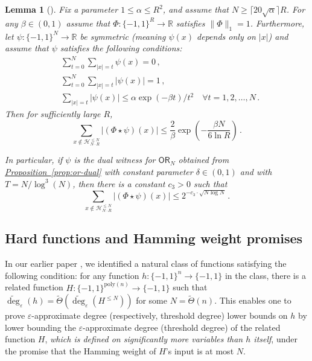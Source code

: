 \documentclass[11pt]{article}
\numberwithin{equation}{section}
\newtheorem{lemma}[theorem]{Lemma}
\theoremstyle{definition}
\theoremstyle{plain}
\newcommand{\R}{\mathbb R}
\newcommand{\expref}[2]{\hyperref[#2]{#1~\ref{#2}}}
\newcommand{\poly}{\mathrm{poly}}
\newcommand{\OR}{\mathsf{ OR}}
\newcommand{\bits}{\{-1,1\}}
\newcommand{\ls}{\star}
\newcommand{\eps}{\varepsilon}
\newcommand{\adeg}{\widetilde{\operatorname{deg}}}
\begin{document}
\begin{lemma}[\cite{bkt}] \label{prop:prelim-mass}
	Fix a parameter $1 \leq \alpha \leq R^2$, and assume that $N \geq \lceil 20 \sqrt{\alpha} \rceil R$.
	For any $\beta \in (0,1)$
	assume that $\Phi : \bits^R \to \R$ satisfies $\|\Phi\|_1=1$. Furthermore, let $\psi : \bits^N \to \R$ be symmetric
	(meaning $\psi(x)$ depends only on $|x|$) and assume that $\psi$ satisfies the following conditions: 
	\begin{align}
&\sum_{t = 0}^N \sum_{|x|=t} \psi(x) = 0\,, \label{eqn:omega-balanced}\\
&\sum_{t = 0}^N \sum_{|x| = t} |\psi(x)| = 1\,, \label{eqn:omega-norm}\\
&\sum_{|x| = t} |\psi(x)| \le \alpha \exp (-\beta t) / t^2 \quad \forall t = 1, 2, \dots, N\,. \label{eqn:omega-decay}
	\end{align}
	Then for sufficiently large $R$, 
	\begin{equation}
	\sum_{x \notin \mathcal{H}^{\le N}_{N \cdot R}} |(\Phi \ls \psi)(x)| \le \frac{2}{\beta} \exp\left(-\frac{\beta N}{6 \ln R}\right)\,.
	\label{eqn:prelim-mass}
	\end{equation}
	
	In particular, if $\psi$ is the dual witness for $\OR_N$ obtained from \expref{Proposition}{prop:or-dual} with constant parameter $\delta \in (0, 1)$ and with $T=N/\log^3(N)$,
	then there is a constant $c_3 > 0$ such that
	\begin{equation}
	\sum_{x \notin \mathcal{H}^{\le N}_{N \cdot R}} |(\Phi \ls \psi)(x)| \le 2^{-c_3 \cdot \sqrt{N \log N}}\,. \label{eqn:prelim-mass-OR}
	\end{equation}
\end{lemma}


\subsection{Hard functions and Hamming weight promises}

In our %
earlier paper %
\cite{adegsurj}, we identified a natural class 
of functions satisfying the following %
condition: %
for any function $h \colon \bits^n \to \bits$ in the class,
there is a related function $H \colon \bits^{\poly(n)} \to \bits$ such that 
$\adeg_{\eps}(h) = \tilde{\Theta}(\adeg_{\eps}(H^{\leq N}))$ for some $N=\tilde{\Theta}(n)$.
This enables one to prove $\eps$-approximate degree (respectively, threshold degree) lower bounds on $h$ by lower bounding
the $\eps$-approximate degree (threshold degree) of the related function $H$, \emph{which is defined on significantly more
	variables than $h$ itself}, under the promise that the Hamming weight of $H$'s input is at most $N$.
\end{document}
